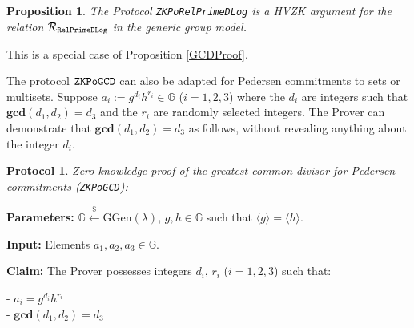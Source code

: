 \documentclass[11pt, lettersize, notitlepage, leqno, footskip=0.6cm]{article}
\newcommand{\bG}{\mathbb{G}}
\newcommand{\la}{\langle}
\newcommand{\ra}{\rangle}
\newcommand{\mc}{\mathcal}
\newcommand{\mb}{\mathbb}
\newcommand{\mbf}{\mathbf}
\newcommand{\mr}{\mathrm}
\newcommand{\lamb}{\lambda}
\newcommand{\noin}{\noindent}
\newcommand{\GCD}{\mbf{gcd}}
\newtheorem{Prop}[Thm]{Proposition}
\newtheorem{Prot}[Thm]{Protocol}
\numberwithin{equation}{section}
\begin{document}
\vspace{0.1cm}

\begin{Prop} The Protocol \verb|ZKPoRelPrimeDLog| is a HVZK argument for the relation $\mc{R}_{{\tt{RelPrimeDLog}}}$ in the generic group model.\end{Prop}

\begin{prf} This is a special case of Proposition \ref{GCDProof}.\end{prf}

The protocol $\tt{ZKPoGCD}$ can also be adapted for Pedersen commitments to sets or multisets. Suppose $ a_i:= g^{d_i}h^{r_i}\in \bG $ ($i=1,2,3$) where the $d_i$ are integers such that $\GCD(d_1,d_2) = d_3$ and the $r_i$ are randomly selected integers. The Prover can demonstrate that $\GCD(d_1,d_2) = d_3$ as follows, without revealing anything about the integer $d_i$. \vspace{0.1cm}

\begin{Prot} \normalfont \hypertarget{GCDPedersen}{\textit{Zero knowledge proof of the greatest common divisor for Pedersen commitments}} (\verb|ZKPoGCD|):\end{Prot} \vspace{-0.3cm}

\noin \textbf{Parameters:} $\mb{G}\xleftarrow{\$} \mr{GGen}(\lamb)$,  $g,h\in \mb{G}$ such that $\la g \ra = \la h \ra$.

\noin \textbf{Input:} Elements $a_1, a_2, a_3\in \mb{G}$.

\noin \textbf{Claim:} The Prover possesses integers $d_i$, $r_i$ ($i=1,2,3$) such that:

\noin - $a_i = g^{d_i}h^{r_i}$\\
\noin - $\GCD(d_1, d_2) = d_3$
\end{document}
